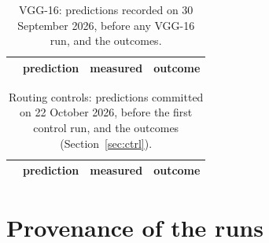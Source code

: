 \documentclass[10pt,a4paper]{article}
\begin{document}
\begin{table}[!htbp]\centering\small
\caption{VGG-16: predictions recorded on 30 September 2026, before any
VGG-16 run, and the outcomes.}
\label{tab:vgprereg}
\begin{tabular}{l p{8.2cm} l l}
\toprule
& prediction & measured & outcome \\
\midrule
\bottomrule
\end{tabular}
\end{table}

\begin{table}[!htbp]\centering\small
\caption{Routing controls: predictions committed on 22 October 2026, before
the first control run, and the outcomes (Section~\ref{sec:ctrl}).}
\label{tab:ctprereg}
\begin{tabular}{l p{8.2cm} l l}
\toprule
& prediction & measured & outcome \\
\midrule
\bottomrule
\end{tabular}
\end{table}

\FloatBarrier

\clearpage

\section{Provenance of the runs}\label{app:prov}
\end{document}

